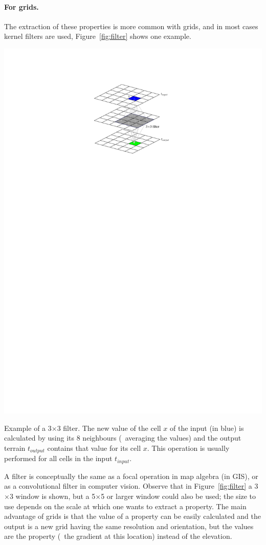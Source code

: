 \paragraph{For grids.}
The extraction of these properties is more common with grids, and in most cases kernel filters are used, Figure~\ref{fig:filter} shows one example.
\begin{marginfigure}
  \centering
  \includegraphics[width=\linewidth]{figs/filter}
  \caption{Example of a 3$\times$3 filter. The new value of the cell $x$ of the input (in blue) is calculated by using its 8 neighbours (\eg\ averaging the values) and the output terrain $t_{output}$ contains that value for its cell $x$. This operation is usually performed for all cells in the input $t_{input}$.}%
\label{fig:filter}
\end{marginfigure}%
A filter is conceptually the same as a focal operation in map algebra (in GIS), or as a convolutional filter in computer vision.
Observe that in Figure~\ref{fig:filter} a 3$\times$3 window is shown, but a 5$\times$5%
or larger window could also be used; the size to use depends on the scale at which one wants to extract a property.
The main advantage of grids is that the value of a property can be easily calculated and the output is a new grid having the same resolution and orientation, but the values are the property (\eg\ the gradient at this location) instead of the elevation.


